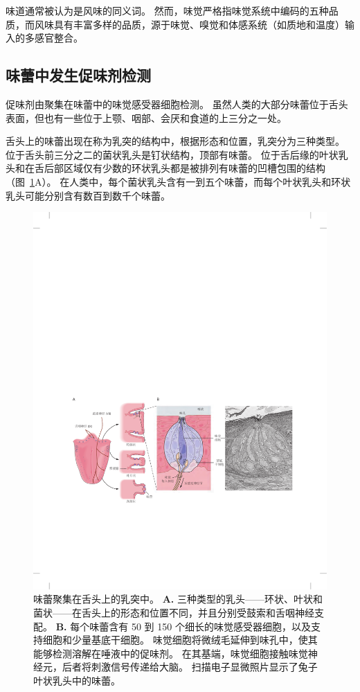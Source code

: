 味道通常被认为是风味的同义词。
然而，味觉严格指味觉系统中编码的五种品质，而风味具有丰富多样的品质，源于味觉、嗅觉和体感系统（如质地和温度）输入的多感官整合。



\subsection{味蕾中发生促味剂检测}

促味剂由聚集在味蕾中的味觉感受器细胞检测。
虽然人类的大部分味蕾位于舌头表面，但也有一些位于上颚、咽部、会厌和食道的上三分之一处。


舌头上的味蕾出现在称为乳突的结构中，根据形态和位置，乳突分为三种类型。
位于舌头前三分之二的菌状乳头是钉状结构，顶部有味蕾。
位于舌后缘的叶状乳头和在舌后部区域仅有少数的环状乳头都是被排列有味蕾的凹槽包围的结构（图~\ref{fig:29_13}A）。
在人类中，每个菌状乳头含有一到五个味蕾，而每个叶状乳头和环状乳头可能分别含有数百到数千个味蕾。


\begin{figure}[htbp]
	\centering
	\includegraphics[width=0.95\linewidth]{chap29/fig_29_13}
	\caption{味蕾聚集在舌头上的乳突中。
		\textbf{A.} 三种类型的乳头——环状、叶状和菌状——在舌头上的形态和位置不同，并且分别受鼓索和舌咽神经支配。
		\textbf{B.} 每个味蕾含有 50 到 150 个细长的味觉感受器细胞，以及支持细胞和少量基底干细胞。
		味觉细胞将微绒毛延伸到味孔中，使其能够检测溶解在唾液中的促味剂。
		在其基端，味觉细胞接触味觉神经元，后者将刺激信号传递给大脑。
		扫描电子显微照片显示了兔子叶状乳头中的味蕾。}
	\label{fig:29_13}
\end{figure}



